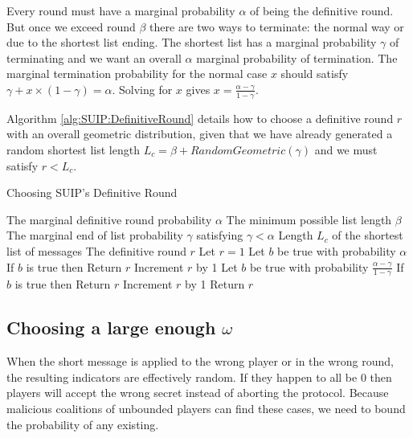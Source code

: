 \documentclass{dalcsthesis}
\begin{document}
Every round must have a marginal probability $\alpha$ of being the definitive round. But once we exceed round $\beta$ there are two ways to terminate: the normal way or due to the shortest list ending. The shortest list has a marginal probability $\gamma$ of terminating and we want an overall $\alpha$ marginal probability of termination. The marginal termination probability for the normal case $x$ should satisfy $\gamma + x \times (1 - \gamma) = \alpha$. Solving for $x$ gives $x = \frac{\alpha - \gamma}{1 - \gamma}$.

Algorithm \ref{alg:SUIP:DefinitiveRound} details how to choose a definitive round $r$ with an overall geometric distribution, given that we have already generated a random shortest list length $L_c = \beta + RandomGeometric(\gamma)$ and we must satisfy $r < L_c$.

\begin{algorithm}
  \caption{Choosing SUIP's Definitive Round}
  \label{alg:SUIP:DefinitiveRound}
  \begin{algorithmic}[1]
    \INPUT The marginal definitive round probability $\alpha$ 
    \INPUT The minimum possible list length $\beta$
    \INPUT The marginal end of list probability $\gamma$ satisfying $\gamma < \alpha$
    \INPUT Length $L_c$ of the shortest list of messages
    \OUTPUT The definitive round $r$
    \STATE Let $r = 1$
      \STATE Let $b$ be true with probability $\alpha$
      \STATE If $b$ is true then Return $r$
      \STATE Increment $r$ by 1 
    \ENDWHILE
      \STATE Let $b$ be true with probability $\frac{\alpha - \gamma}{1 - \gamma}$
      \STATE If $b$ is true then Return $r$
      \STATE Increment $r$ by 1
    \ENDWHILE
    \STATE Return $r$
  \end{algorithmic}
\end{algorithm}

\subsection{Choosing a large enough $\omega$}
\label{Sec:SUIP:MinIndicators}

When the short message is applied to the wrong player or in the wrong round, the resulting indicators are effectively random. If they happen to all be 0 then players will accept the wrong secret instead of aborting the protocol. Because malicious coalitions of unbounded players can find these cases, we need to bound the probability of any existing.
\end{document}
